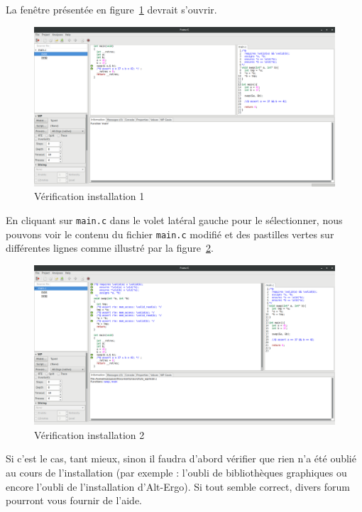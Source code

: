 \documentclass[12pt,francais,]{scrbook}
\begin{document}
La fenêtre présentée en figure~\ref{fig:install-1} devrait s'ouvrir.

\begin{figure}[htbp]
\centering
\includegraphics[scale=0.5]{1-2-verif_install-1.png}
\caption{Vérification installation 1}
\label{fig:install-1}
\end{figure}

En cliquant sur \texttt{main.c} dans le volet latéral gauche pour le
sélectionner, nous pouvons voir le contenu du fichier \texttt{main.c}
modifié et des pastilles vertes sur différentes lignes comme
illustré par la figure~\ref{fig:install-2}.

\begin{figure}[htbp]
\centering
\includegraphics[scale=0.5]{1-2-verif_install-2.png}
\caption{Vérification installation 2}
\label{fig:install-2}
\end{figure}

Si c'est le cas, tant mieux, sinon il faudra d'abord vérifier que rien
n'a été oublié au cours de l'installation (par exemple : l'oubli de
bibliothèques graphiques ou encore l'oubli de l'installation
d'Alt-Ergo). Si tout semble correct, divers forum pourront vous fournir
de l'aide.
\end{document}
